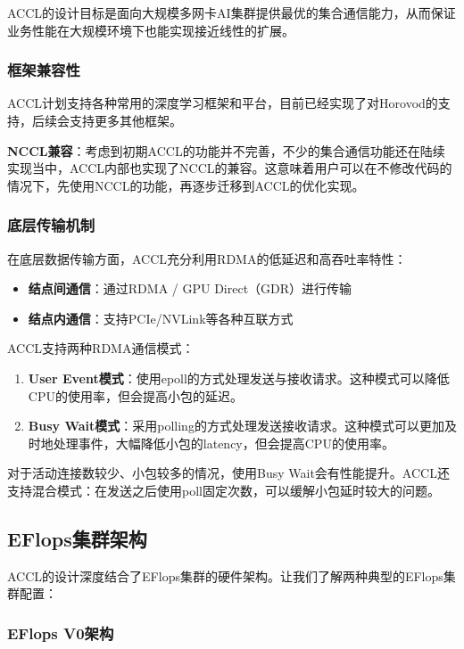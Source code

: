 ACCL的设计目标是面向大规模多网卡AI集群提供最优的集合通信能力，从而保证业务性能在大规模环境下也能实现接近线性的扩展。

\subsubsection{框架兼容性}

ACCL计划支持各种常用的深度学习框架和平台，目前已经实现了对Horovod的支持，后续会支持更多其他框架。

\textbf{NCCL兼容}：考虑到初期ACCL的功能并不完善，不少的集合通信功能还在陆续实现当中，ACCL内部也实现了NCCL的兼容。这意味着用户可以在不修改代码的情况下，先使用NCCL的功能，再逐步迁移到ACCL的优化实现。

\subsubsection{底层传输机制}

在底层数据传输方面，ACCL充分利用RDMA的低延迟和高吞吐率特性：
\begin{itemize}
    \item \textbf{结点间通信}：通过RDMA / GPU Direct（GDR）进行传输
    \item \textbf{结点内通信}：支持PCIe/NVLink等各种互联方式
\end{itemize}

ACCL支持两种RDMA通信模式：
\begin{enumerate}
    \item \textbf{User Event模式}：使用epoll的方式处理发送与接收请求。这种模式可以降低CPU的使用率，但会提高小包的延迟。
    \item \textbf{Busy Wait模式}：采用polling的方式处理发送接收请求。这种模式可以更加及时地处理事件，大幅降低小包的latency，但会提高CPU的使用率。
\end{enumerate}

对于活动连接数较少、小包较多的情况，使用Busy Wait会有性能提升。ACCL还支持混合模式：在发送之后使用poll固定次数，可以缓解小包延时较大的问题。

\subsection{EFlops集群架构}

ACCL的设计深度结合了EFlops集群的硬件架构。让我们了解两种典型的EFlops集群配置：

\subsubsection{EFlops V0架构}

